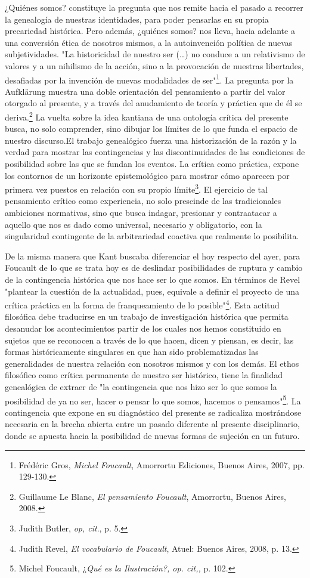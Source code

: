 \documentclass{book}
\begin{document}
¿Quiénes somos? constituye la pregunta que nos remite hacia el pasado a
recorrer la genealogía de nuestras identidades, para poder pensarlas en
su propia precariedad histórica. Pero además, ¿quiénes somos? nos lleva,
hacia adelante a una conversión ética de nosotros mismos, a la
autoinvención política de nuevas subjetividades. "La historicidad de
nuestro ser (\dots) no conduce a un relativismo de valores y a un
nihilismo de la acción, sino a la provocación de nuestras libertades,
desafiadas por la invención de nuevas modalidades de ser"\footnote{Frédéric
  Gros, \emph{Michel Foucault}, Amorrortu Ediciones, Buenos Aires, 2007,
  pp. 129-130.}. La pregunta por la Aufklärung muestra una doble
orientación del pensamiento a partir del valor otorgado al presente, y a
través del anudamiento de teoría y práctica que de él se
deriva.\footnote{Guillaume Le Blanc, \emph{El pensamiento Foucault},
  Amorrortu, Buenos Aires, 2008.} La vuelta sobre la idea kantiana de
una ontología crítica del presente busca, no solo comprender, sino
dibujar los límites de lo que funda el espacio de nuestro discurso.El
trabajo genealógico fuerza una historización de la razón y la verdad
para mostrar las contingencias y las discontinuidades de las condiciones
de posibilidad sobre las que se fundan los eventos. La crítica como
práctica, expone los contornos de un horizonte epistemológico para
mostrar cómo aparecen por primera vez puestos en relación con su propio
límite\footnote{Judith Butler, \emph{op, cit}., p. 5.}. El ejercicio de
tal pensamiento crítico como experiencia, no solo prescinde de las
tradicionales ambiciones normativas, sino que busca indagar, presionar y
contraatacar a aquello que nos es dado como universal, necesario y
obligatorio, con la singularidad contingente de la arbitrariedad
coactiva que realmente lo posibilita.

De la misma manera que Kant buscaba diferenciar el hoy respecto del
ayer, para Foucault de lo que se trata hoy es de deslindar posibilidades
de ruptura y cambio de la contingencia histórica que nos hace ser lo que
somos. En términos de Revel "plantear la cuestión de la actualidad,
pues, equivale a definir el proyecto de una crítica práctica en la forma
de franqueamiento de lo posible"\footnote{Judith Revel, \emph{El
  vocabulario de Foucault}, Atuel: Buenos Aires, 2008, p. 13.}. Esta
actitud filosófica debe traducirse en un trabajo de investigación
histórica que permita desanudar los acontecimientos partir de los cuales
nos hemos constituido en sujetos que se reconocen a través de lo que
hacen, dicen y piensan, es decir, las formas históricamente singulares
en que han sido problematizadas las generalidades de nuestra relación
con nosotros mismos y con los demás. El ethos filosófico como crítica
permanente de nuestro ser histórico, tiene la finalidad genealógica de
extraer de "la contingencia que nos hizo ser lo que somos la posibilidad
de ya no ser, hacer o pensar lo que somos, hacemos o
pensamos"\footnote{Michel Foucault, ¿\emph{Qué es la Ilustración?, op.
  cit,,} p. 102.}. La contingencia que expone en su diagnóstico del
presente se radicaliza mostrándose necesaria en la brecha abierta entre
un pasado diferente al presente disciplinario, donde se apuesta hacia la
posibilidad de nuevas formas de sujeción en un futuro.
\end{document}
